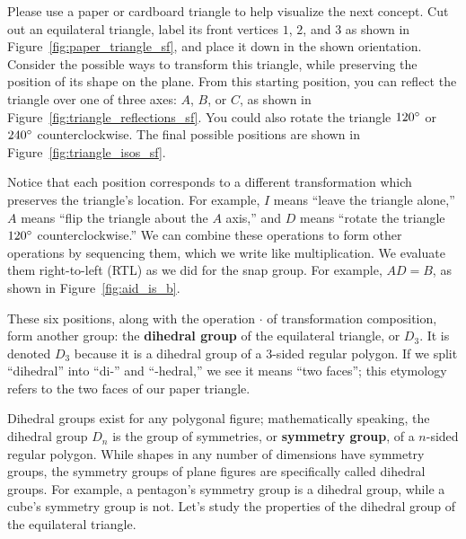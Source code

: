 \documentclass[../textbook.tex]{subfiles}
\begin{document}

\noindent Please use a paper or cardboard triangle to help visualize the next concept. Cut out an equilateral triangle, label its front vertices $1$, $2$, and $3$ as shown in Figure~\ref{fig:paper_triangle_sf}, and place it down in the shown orientation. Consider the possible ways to transform this triangle, while preserving the position of its shape on the plane. From this starting position, you can reflect the triangle over one of three axes: $A$, $B$, or $C$, as shown in Figure~\ref{fig:triangle_reflections_sf}. You could also rotate the triangle $120^\circ{}$ or $240^\circ{}$ counterclockwise. The final possible positions are shown in Figure~\ref{fig:triangle_isos_sf}.

Notice that each position corresponds to a different transformation which preserves the triangle's location. For example, $I$ means ``leave the triangle alone,'' $A$ means ``flip the triangle about the $A$ axis,'' and $D$ means ``rotate the triangle $120^\circ{}$ counterclockwise.'' We can combine these operations to form other operations by sequencing them, which we write like multiplication. We evaluate them right-to-left (RTL) as we did for the snap group. For example, $AD=B$, as shown in Figure~\ref{fig:aid_is_b}.

These six positions, along with the operation $\cdot$ of transformation composition, form another group: the \textbf{dihedral group} of the equilateral triangle, or $D_3$. It is denoted $D_3$ because it is a dihedral group of a $3$-sided regular polygon. If we split ``dihedral'' into ``di-'' and ``-hedral,'' we see it means ``two faces''; this etymology refers to the two faces of our paper triangle.

Dihedral groups exist for any polygonal figure; mathematically speaking, the dihedral group $D_n$ is the group of symmetries, or \textbf{symmetry group}, of a $n$-sided regular polygon. While shapes in any number of dimensions have symmetry groups, the symmetry groups of plane figures are specifically called dihedral groups. For example, a pentagon's symmetry group is a dihedral group, while a cube's symmetry group is not. Let's study the properties of the dihedral group of the equilateral triangle.

\end{document}
